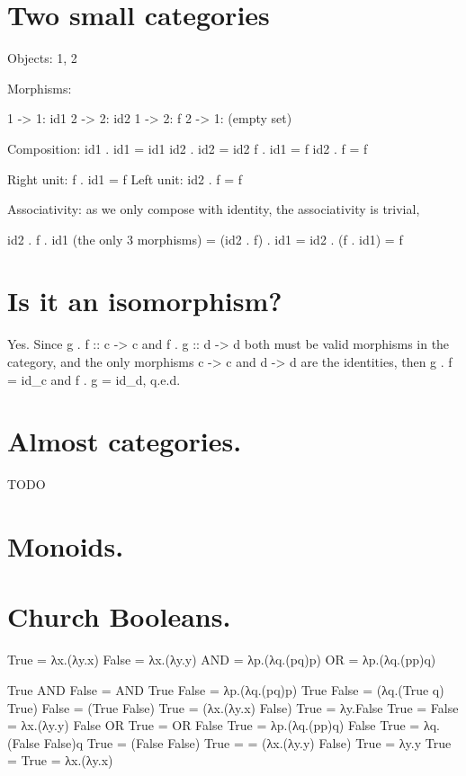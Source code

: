 

\section{Two small categories}

Objects: 1, 2

Morphisms: 

1 -> 1: id1
2 -> 2: id2
1 -> 2: f
2 -> 1: (empty set)

Composition:
  id1 . id1 = id1
  id2 . id2 = id2
  f . id1 = f
  id2 . f = f

Right unit: f . id1 = f
Left unit: id2 . f = f

Associativity: as we only compose with identity, the associativity is trivial,

   id2 . f . id1 (the only 3 morphisms) = (id2 . f) . id1 = id2 . (f . id1) = f

\section{ Is it an isomorphism? }

Yes. Since g . f :: c -> c and f . g :: d -> d both must be valid morphisms
in the category, and the only morphisms c -> c and d -> d are the identities,
then g . f = id_c and f . g = id_d, q.e.d.

\section{ Almost categories. }

TODO

\section{ Monoids. }

\section{ Church Booleans. }

True = λx.(λy.x)
False = λx.(λy.y)
AND = λp.(λq.(pq)p)
OR = λp.(λq.(pp)q)

True AND False = AND True False = λp.(λq.(pq)p) True False 
               = (λq.(True q) True) False = (True False) True 
               = (λx.(λy.x) False) True = λy.False True = False = λx.(λy.y)
False OR True  = OR False True = λp.(λq.(pp)q) False True
               = λq.(False False)q True = (False False) True =
               = (λx.(λy.y) False) True = λy.y True = True = λx.(λy.x)

